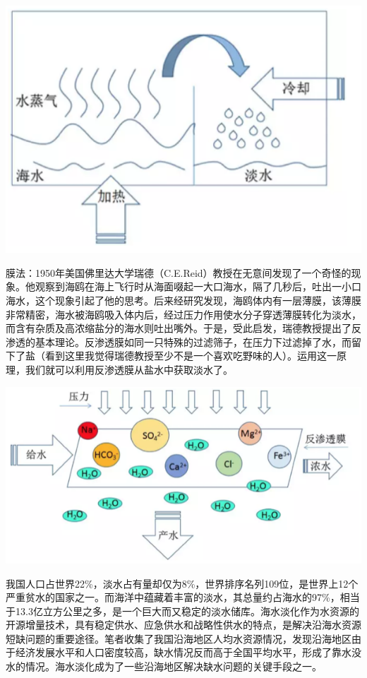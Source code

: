\documentclass[
]{book}
\begin{document}
\includegraphics[width=8.33in]{images/seawater1}

膜法：1950年美国佛里达大学瑞德（C.E.Reid）教授在无意间发现了一个奇怪的现象。他观察到海鸥在海上飞行时从海面啜起一大口海水，隔了几秒后，吐出一小口海水，这个现象引起了他的思考。后来经研究发现，海鸥体内有一层薄膜，该薄膜非常精密，海水被海鸥吸入体内后，经过压力作用使水分子穿透薄膜转化为淡水，而含有杂质及高浓缩盐分的海水则吐出嘴外。于是，受此启发，瑞德教授提出了反渗透的基本理论。反渗透膜如同一只特殊的过滤筛子，在压力下过滤掉了水，而留下了盐（看到这里我觉得瑞德教授至少不是一个喜欢吃野味的人）。运用这一原理，我们就可以利用反渗透膜从盐水中获取淡水了。

\includegraphics[width=8.33in]{images/seawater2}

我国人口占世界22\%，淡水占有量却仅为8\%，世界排序名列109位，是世界上12个严重贫水的国家之一。而海洋中蕴藏着丰富的淡水，其总量约占海水的97\%，相当于13.3亿立方公里之多，是一个巨大而又稳定的淡水储库。海水淡化作为水资源的开源增量技术，具有稳定供水、应急供水和战略性供水的特点，是解决沿海水资源短缺问题的重要途径。笔者收集了我国沿海地区人均水资源情况，发现沿海地区由于经济发展水平和人口密度较高，缺水情况反而高于全国平均水平，形成了靠水没水的情况。海水淡化成为了一些沿海地区解决缺水问题的关键手段之一。
\end{document}
